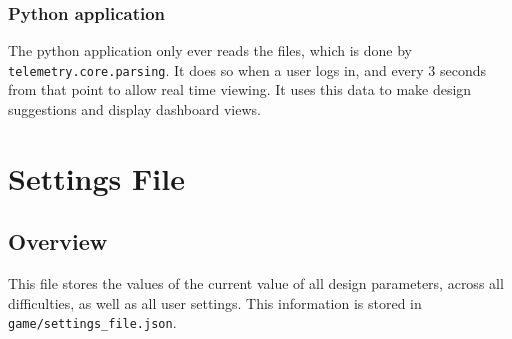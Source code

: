 \documentclass[11pt]{article}
\begin{document}
\subsubsection{Python application}
The python application only ever reads the files, which is done by \verb|telemetry.core.parsing|. It does so when a user logs in, and every 3 seconds from that point to allow real time viewing. It uses this data to make design suggestions and display dashboard views.

\section{Settings File}

\subsection{Overview}
This file stores the values of the current value of all design parameters, across all difficulties, as well as all user settings. This information is stored in \verb|game/settings_file.json|.
\end{document}
